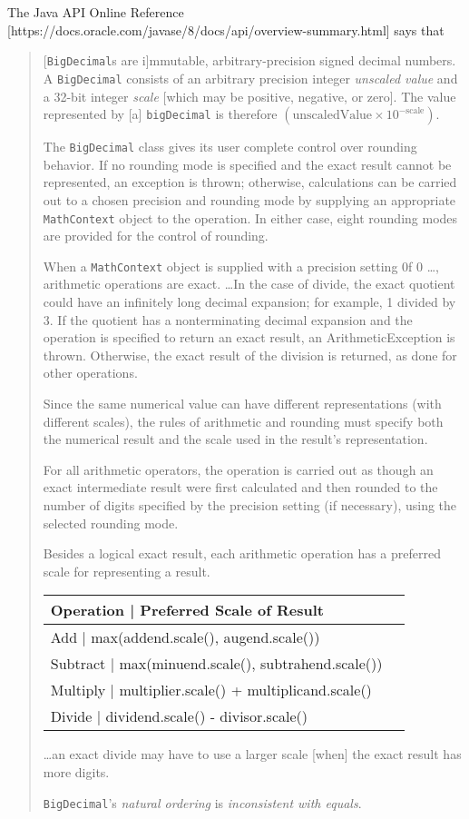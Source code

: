 \documentclass{article}
\begin{document}
The Java API Online Reference
[https://docs.oracle.com/javase/8/docs/api/overview-summary.html]
says that
\begin{quote}
[{\tt BigDecimal}s are i]mmutable, arbitrary-precision
signed decimal numbers.  A {\tt BigDecimal} consists of an
arbitrary precision integer {\it unscaled value} and a 32-bit
integer {\it scale} [which may be positive, negative, or zero].
The value represented by [a] {\tt bigDecimal} is therefore
$(\mbox{unscaledValue} \times 10^{-\mbox{scale}})$.

The {\tt BigDecimal} class gives its user complete control over
rounding behavior.  If no rounding mode is specified and the exact
result cannot be represented, an exception is thrown; otherwise,
calculations can be carried out to a chosen precision and rounding mode
by supplying an appropriate {\tt MathContext} object to the operation.  In
either case, eight rounding modes are provided for the control of
rounding.

When a {\tt MathContext} object is supplied with a precision setting
0f 0 \dots, arithmetic operations are exact.  \dots In the case of
divide, the exact quotient could have an infinitely long decimal
expansion; for example, 1 divided by 3.  If the quotient has a
nonterminating decimal expansion and the operation is specified to
return an exact result, an ArithmeticException is thrown.  Otherwise,
the exact result of the division is returned, as done for other
operations.

Since the same numerical value can have different representations (with
different scales), the rules of arithmetic and rounding must specify
both the numerical result and the scale used in the result's
representation.

For all arithmetic operators, the operation is carried out as though an
exact intermediate result were first calculated and then rounded to the
number of digits specified by the precision setting (if necessary),
using the selected rounding mode.

Besides a logical exact result, each arithmetic operation has a
preferred scale for representing a result.

\begin{tabular}{|l|l|}
\hline
Operation | Preferred Scale of Result\\
\hline
Add | max(addend.scale(), augend.scale())\\
\hline
Subtract | max(minuend.scale(), subtrahend.scale())\\
\hline
Multiply | multiplier.scale() + multiplicand.scale()\\
\hline
Divide | dividend.scale() - divisor.scale()\\
\hline
\end{tabular}

\dots an exact divide may have to use a larger scale [when]
the exact result has more digits.

{\tt BigDecimal}'s {\it natural ordering} is
{\it inconsistent with equals}.
\end{quote}
\end{document}
